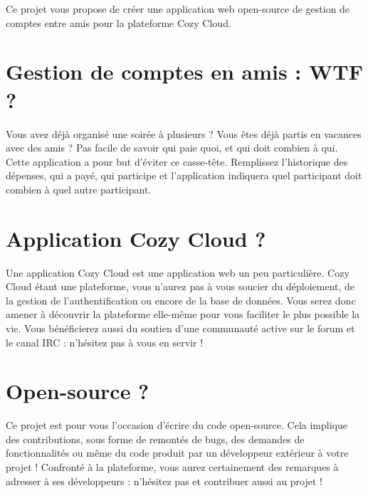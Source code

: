 \documentclass{42-fr}
\begin{document}
	Ce projet vous propose de cr\'eer une application web open-source de gestion de
	comptes entre amis pour la plateforme Cozy Cloud.

	\section{Gestion de comptes en amis : WTF ?}

		Vous avez d\'ej\`a organisé une soir\'ee \`a plusieurs ? Vous \^etes d\'ej\`a partis en
		vacances avec des amis ? Pas facile de savoir qui paie quoi, et qui doit
		combien \`a qui. Cette application a pour but d'\'eviter ce casse-t\^ete. Remplissez
		l'historique des d\'epenses, qui a pay\'e, qui participe et l'application
		indiquera quel participant doit combien \`a quel autre participant.

	\section{Application Cozy Cloud ?}

		Une application Cozy Cloud est une application web un peu particuli\`ere.
		Cozy Cloud \'etant une plateforme, vous n'aurez pas \`a vous soucier du
		d\'eploiement, de la gestion de l'authentification ou encore de la base de
		donn\'ees. Vous serez donc amener \`a d\'ecouvrir la plateforme elle-m\^eme pour
		vous faciliter le plus possible la vie.\newline
		Vous b\'en\'eficierez aussi du soutien d'une communaut\'e active sur le 
		forum et le canal IRC : n'h\'esitez pas \`a vous en servir !


	\section{Open-source ?}

		Ce projet est pour vous l'occasion d'\'ecrire du code open-source.
		Cela implique des contributions, sous forme de remont\'es de bugs, des
		demandes de fonctionnalit\'es ou m\^eme du code produit par un d\'eveloppeur
		ext\'erieur \`a votre projet !
		Confront\'e \`a la plateforme, vous aurez certainement des remarques \`a
		adresser \`a ses d\'eveloppeurs : n'h\'esitez pas et contribuer aussi au projet !



\end{document}
